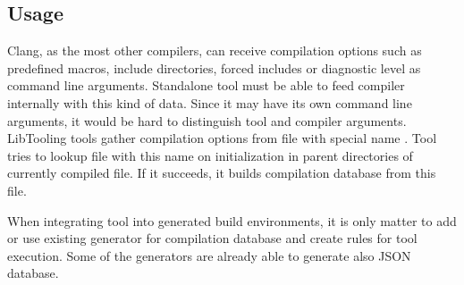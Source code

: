 \subsection{Usage}
Clang, as the most other compilers, can receive compilation options such as predefined macros, include directories, forced includes or diagnostic level as command line arguments. Standalone tool must be able to feed compiler internally with this kind of data. Since it may have its own command line arguments, it would be hard to distinguish tool and compiler arguments. LibTooling tools gather compilation options from file with special name . Tool tries to lookup file with this name on initialization in parent directories of currently compiled file. If it succeeds, it builds compilation database from this file.

When integrating tool into generated build environments, it is only matter to add or use existing generator for compilation database and create rules for tool execution. Some of the  generators are already able to generate also JSON database.
